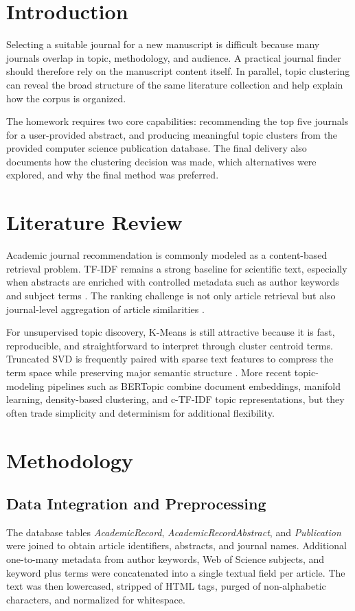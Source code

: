 \documentclass[conference]{IEEEtran}
\begin{document}
\section{Introduction}
Selecting a suitable journal for a new manuscript is difficult because many journals overlap in topic, methodology, and audience. A practical journal finder should therefore rely on the manuscript content itself. In parallel, topic clustering can reveal the broad structure of the same literature collection and help explain how the corpus is organized.

The homework requires two core capabilities: recommending the top five journals for a user-provided abstract, and producing meaningful topic clusters from the provided computer science publication database. The final delivery also documents how the clustering decision was made, which alternatives were explored, and why the final method was preferred.

\section{Literature Review}
Academic journal recommendation is commonly modeled as a content-based retrieval problem. TF-IDF remains a strong baseline for scientific text, especially when abstracts are enriched with controlled metadata such as author keywords and subject terms \cite{cbf_recommender,metadata_nlp}. The ranking challenge is not only article retrieval but also journal-level aggregation of article similarities \cite{journal_scoring}.

For unsupervised topic discovery, K-Means is still attractive because it is fast, reproducible, and straightforward to interpret through cluster centroid terms. Truncated SVD is frequently paired with sparse text features to compress the term space while preserving major semantic structure \cite{kmeans_svd}. More recent topic-modeling pipelines such as BERTopic combine document embeddings, manifold learning, density-based clustering, and c-TF-IDF topic representations, but they often trade simplicity and determinism for additional flexibility.

\section{Methodology}
\subsection{Data Integration and Preprocessing}
The database tables \textit{AcademicRecord}, \textit{AcademicRecordAbstract}, and \textit{Publication} were joined to obtain article identifiers, abstracts, and journal names. Additional one-to-many metadata from author keywords, Web of Science subjects, and keyword plus terms were concatenated into a single textual field per article. The text was then lowercased, stripped of HTML tags, purged of non-alphabetic characters, and normalized for whitespace.
\end{document}
